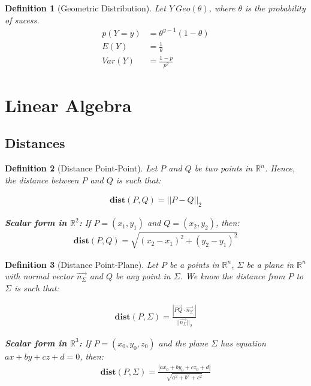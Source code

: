 \documentclass{article}
\newtheorem{definition}{Definition}[section]
\begin{document}
\begin{definition}[Geometric Distribution]
	Let $ Y ~ Geo(\theta)$, where $\theta$ is the probability of sucess.
	\begin{align}
		p(Y = y) & = \theta^{y -1}(1 - \theta) \\
		E(Y) &= \frac{1}{\theta} \\
		Var(Y) &= \frac{1 - p}{p ^2}
	\end{align}
\end{definition}


\section{Linear Algebra}

\subsection{Distances}

\begin{definition}[Distance Point-Point]
	Let $P$ and $Q$ be two points in $\mathbb{R}^n$. Hence, the distance between $P$ and $Q$ is such that:
	
	\begin{align}
		\mathbf{dist}(P,Q) = || P - Q||_2
	\end{align}
	
	\textbf{Scalar form in $\mathbb{R}^2$:} If $P = (x_1, y_1)$ and $Q = (x_2, y_2)$, then:
	\begin{align}
		\mathbf{dist}(P,Q) = \sqrt{(x_2-x_1)^2 + (y_2-y_1)^2}
	\end{align}
\end{definition}

\begin{definition}[Distance Point-Plane]
	Let $P$ be a points in $\mathbb{R}^n$, $\Sigma$ be a plane in $\mathbb{R}^n$ with normal vector $\vec{n_{\Sigma}}$ and $Q$ be any point in $\Sigma$. We know the distance from $P$ to $\Sigma$ is such that:
	
	\begin{align}
		\mathbf{dist}(P,\Sigma) =\frac{ | \vec{PQ} \cdot \vec{n_\Sigma} \ | }{|| \vec{n_\Sigma}||_2}
	\end{align}	
	
	\textbf{Scalar form in $\mathbb{R}^3$:} If $P = (x_0, y_0, z_0)$ and the plane $\Sigma$ has equation $ax + by + cz + d = 0$, then:
	\begin{align}
		\mathbf{dist}(P,\Sigma) = \frac{|ax_0 + by_0 + cz_0 + d|}{\sqrt{a^2 + b^2 + c^2}}
	\end{align}
\end{definition}
\end{document}
